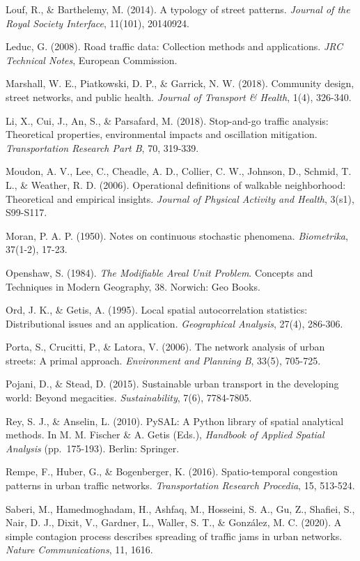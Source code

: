 \documentclass[
  12pt,
]{article}
\begin{document}
Louf, R., \& Barthelemy, M. (2014). A typology of street patterns. \emph{Journal of the Royal Society Interface}, 11(101), 20140924.

Leduc, G. (2008). Road traffic data: Collection methods and applications. \emph{JRC Technical Notes}, European Commission.

Marshall, W. E., Piatkowski, D. P., \& Garrick, N. W. (2018). Community design, street networks, and public health. \emph{Journal of Transport \& Health}, 1(4), 326-340.

Li, X., Cui, J., An, S., \& Parsafard, M. (2018). Stop-and-go traffic analysis: Theoretical properties, environmental impacts and oscillation mitigation. \emph{Transportation Research Part B}, 70, 319-339.

Moudon, A. V., Lee, C., Cheadle, A. D., Collier, C. W., Johnson, D., Schmid, T. L., \& Weather, R. D. (2006). Operational definitions of walkable neighborhood: Theoretical and empirical insights. \emph{Journal of Physical Activity and Health}, 3(s1), S99-S117.

Moran, P. A. P. (1950). Notes on continuous stochastic phenomena. \emph{Biometrika}, 37(1-2), 17-23.

Openshaw, S. (1984). \emph{The Modifiable Areal Unit Problem}. Concepts and Techniques in Modern Geography, 38. Norwich: Geo Books.

Ord, J. K., \& Getis, A. (1995). Local spatial autocorrelation statistics: Distributional issues and an application. \emph{Geographical Analysis}, 27(4), 286-306.

Porta, S., Crucitti, P., \& Latora, V. (2006). The network analysis of urban streets: A primal approach. \emph{Environment and Planning B}, 33(5), 705-725.

Pojani, D., \& Stead, D. (2015). Sustainable urban transport in the developing world: Beyond megacities. \emph{Sustainability}, 7(6), 7784-7805.

Rey, S. J., \& Anselin, L. (2010). PySAL: A Python library of spatial analytical methods. In M. M. Fischer \& A. Getis (Eds.), \emph{Handbook of Applied Spatial Analysis} (pp.~175-193). Berlin: Springer.

Rempe, F., Huber, G., \& Bogenberger, K. (2016). Spatio-temporal congestion patterns in urban traffic networks. \emph{Transportation Research Procedia}, 15, 513-524.

Saberi, M., Hamedmoghadam, H., Ashfaq, M., Hosseini, S. A., Gu, Z., Shafiei, S., Nair, D. J., Dixit, V., Gardner, L., Waller, S. T., \& González, M. C. (2020). A simple contagion process describes spreading of traffic jams in urban networks. \emph{Nature Communications}, 11, 1616.
\end{document}
